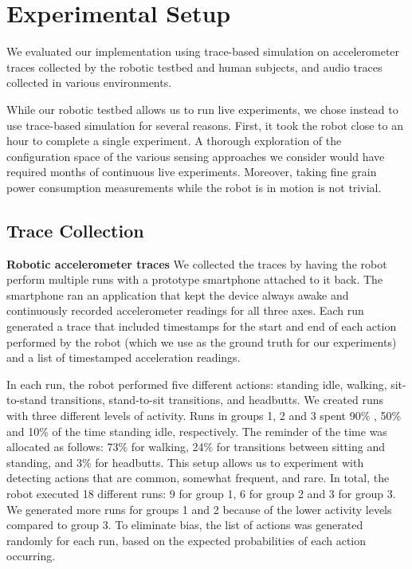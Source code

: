 \section{Experimental Setup}
\label{sec:experimentalSetup}

We evaluated our implementation using trace-based simulation on 
accelerometer traces collected by the robotic testbed and human 
subjects, and audio traces collected in various environments.

While our robotic testbed allows us to run 
live experiments, we chose instead to use trace-based simulation for 
several reasons.  First, it
took the robot close to an hour to complete a single experiment.  A
thorough exploration of the configuration space of the various sensing
approaches we consider would have required months of continuous
live experiments.  Moreover, taking fine grain power consumption
measurements while the robot is in motion is not trivial.


\subsection{Trace Collection}

{\bf Robotic accelerometer traces} We collected the traces by having 
the robot perform multiple runs with
a prototype smartphone attached to it back.  The smartphone ran an
application that kept the device always awake and continuously recorded
accelerometer readings for all three axes.  Each run generated a
trace that included timestamps for the start and end of each action
performed by the robot (which we use as the ground truth for our
experiments) and a list of timestamped acceleration readings.

In each run, the robot performed five different actions: standing
idle, walking, sit-to-stand transitions, stand-to-sit transitions, and
headbutts.  We created runs with three different levels of activity.
Runs in groups 1, 2 and 3 spent 90\% , 50\% and 10\% of the time
standing idle, respectively. The reminder of the time was allocated as
follows: 73\% for walking, 24\% for transitions between sitting and
standing, and 3\% for headbutts.  This setup allows us to experiment
with detecting actions that are common, somewhat frequent, and rare.
In total, the robot executed 18 different runs: 9 for group 1, 6
for group 2 and 3 for group 3.  We generated more runs for groups 1
and 2 because of the lower activity levels compared to group 3. To
eliminate bias, the list of actions was generated randomly for each
run, based on the expected probabilities of each action occurring.

